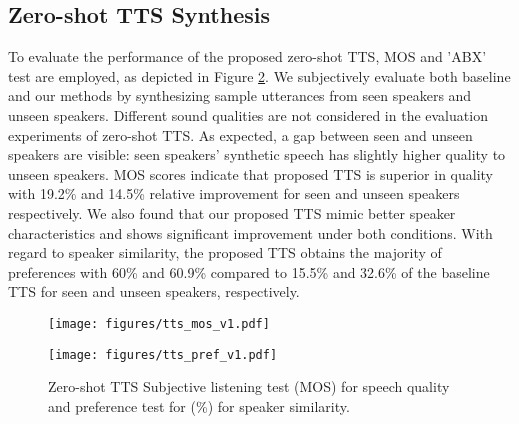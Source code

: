 \documentclass[a4paper]{article}
\begin{document}
\vspace{-2mm}
\subsection{Zero-shot TTS Synthesis}
To evaluate the performance of the proposed zero-shot TTS, MOS and 'ABX' test are employed, as depicted in Figure \ref{tts_subjective}. We subjectively evaluate both baseline \cite{cooper2019zero} and our methods by synthesizing sample utterances from seen speakers and unseen speakers. Different sound qualities are not considered in the evaluation experiments of zero-shot TTS. As expected, a gap between seen and unseen speakers are visible: seen speakers’ synthetic speech has slightly higher quality to unseen speakers. MOS scores indicate that proposed TTS is superior in quality with 19.2\% and 14.5\% relative improvement for seen and unseen speakers respectively. We also found that our proposed TTS mimic better speaker characteristics and shows significant improvement under both conditions. With regard to speaker similarity, the proposed TTS obtains the majority of preferences with 60\% and 60.9\% compared to 15.5\% and 32.6\% of the baseline TTS for seen and unseen speakers, respectively.
\begin{figure}[h!]
  \begin{center}
  \vspace{-3mm}
    \texttt{[image: figures/tts\_mos\_v1.pdf]}
    \vspace{-5mm}
  \end{center}
  \vspace{-8mm}
  \label{tts_subjective}
\end{figure}

\begin{figure}[h!]
  \begin{center}
  \vspace{-2mm}
    \texttt{[image: figures/tts\_pref\_v1.pdf]}
    \vspace{-10mm}
  \end{center}
  \caption{\small Zero-shot TTS Subjective listening test (MOS) for speech quality and preference test for (\%) for speaker similarity.}
  \vspace{-5mm}
  \label{tts_subjective}
\end{figure}

\vspace{-2mm}
\end{document}
